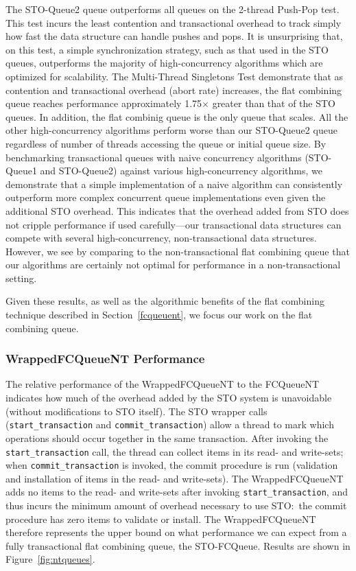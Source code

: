 The STO-Queue2 queue outperforms all queues on the 2-thread Push-Pop test. This test incurs the least contention and transactional overhead to track simply how fast the data structure can handle pushes and pops. It is unsurprising that, on this test, a simple synchronization strategy, such as that used in the STO queues, outperforms the majority of high-concurrency algorithms which are optimized for scalability. The Multi-Thread Singletons Test demonstrate that as contention and transactional overhead (abort rate) increases, the flat combining queue reaches performance approximately 1.75$\times$ greater than that of the STO queues. In addition, the flat combinig queue is the only queue that scales. All the other high-concurrency algorithms perform worse than our STO-Queue2 queue regardless of number of threads accessing the queue or initial queue size.
By benchmarking transactional queues with naive concurrency algorithms (STO-Queue1 and STO-Queue2) against various high-concurrency algorithms, we demonstrate that a simple implementation of a naive algorithm can consistently outperform more complex concurrent queue implementations even given the additional STO overhead. This indicates that the overhead added from STO does not cripple performance if used carefully---our transactional data structures can compete with several high-concurrency, non-transactional data structures. However, we see by comparing to the non-transactional flat combining queue that our algorithms are certainly not optimal for performance in a non-transactional setting.

Given these results, as well as the algorithmic benefits of the flat combining technique described in Section~\ref{fcqueuent}, we focus our work on the flat combining queue.


\subsubsection{WrappedFCQueueNT Performance}
The relative performance of the WrappedFCQueueNT to the FCQueueNT indicates how much of the overhead added by the STO system is unavoidable (without modifications to STO itself). The STO wrapper calls (\texttt{start\_transaction} and \texttt{commit\_transaction}) allow a thread to mark which operations should occur together in the same transaction. After invoking the \texttt{start\_transaction} call, the thread can collect items in its read- and write-sets; when \texttt{commit\_transaction} is invoked, the commit procedure is run (validation and installation of items in the read- and write-sets). The WrappedFCQueueNT adds no items to the read- and write-sets after invoking \texttt{start\_transaction}, and thus incurs the minimum amount of overhead necessary to use STO:\ the commit procedure has zero items to validate or install. The WrappedFCQueueNT therefore represents the upper bound on what performance we can expect from a fully transactional flat combining queue, the STO-FCQueue. 
Results are shown in Figure~\ref{fig:ntqueues}. 

